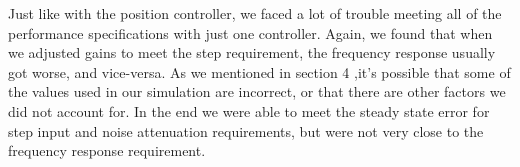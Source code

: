 \documentclass{article}
\theoremstyle{plain}
\theoremstyle{definition}
\theoremstyle{remark}
\begin{document}
Just like with the position controller, we faced a lot of trouble meeting all of the performance specifications with just one controller. Again, we found that when we adjusted gains to meet the step requirement, the frequency response usually got worse, and vice-versa. As we mentioned in section 4 ,it's possible that some of the values used in our simulation are incorrect, or that there are other factors we did not account for. In the end we were able to meet the steady state error for step input and noise attenuation requirements, but were not very close to the frequency response requirement.
\end{document}
